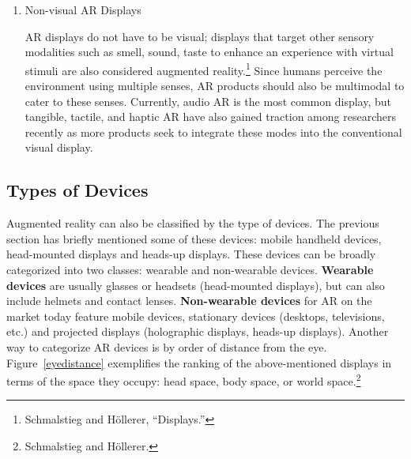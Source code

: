 \begin{enumerate}
\begin{figure}[!ht]
\end{figure}

\item Non-visual AR Displays

AR displays do not have to be visual; displays that target other sensory modalities such as smell, sound, taste to enhance an experience with virtual stimuli are also considered augmented reality.\footnote{Schmalstieg and Höllerer, “Displays.”} Since humans perceive the environment using multiple senses, AR products should also be multimodal to cater to these senses. Currently, audio AR is the most common display, but tangible, tactile, and haptic AR have also gained traction among researchers recently as more products seek to integrate these modes into the conventional visual display.

\end{enumerate}

\subsection{Types of Devices}

\begin{figure}[!ht]
\end{figure}

Augmented reality can also be classified by the type of devices. The previous section has briefly mentioned some of these devices: mobile handheld devices, head-mounted displays and heads-up displays. These devices can be broadly categorized into two classes: wearable and non-wearable devices. \textbf{Wearable devices} are usually glasses or headsets (head-mounted displays), but can also include helmets and contact lenses. \textbf{Non-wearable devices} for AR on the market today feature mobile devices, stationary devices (desktops, televisions, etc.) and projected displays (holographic displays, heads-up displays). Another way to categorize AR devices is by order of distance from the eye. Figure~\ref{eyedistance} exemplifies the ranking of the above-mentioned displays in terms of the space they occupy: head space, body space, or world space.\footnote{Schmalstieg and Höllerer.}


